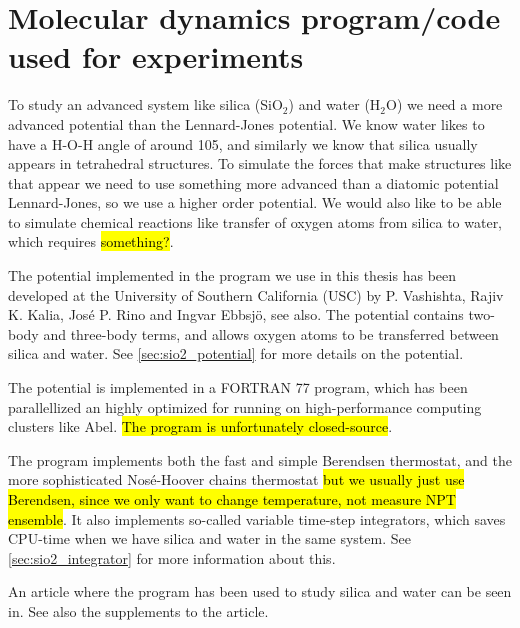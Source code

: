 \chapter{Molecular dynamics program/code used for experiments}
To study an advanced system like silica (SiO$_2$) and water (H$_2$O) we need a more advanced potential than the Lennard-Jones potential. We know water likes to have a H-O-H angle of around 105, and similarly we know that silica usually appears in tetrahedral structures. To simulate the forces that make structures like that appear we need to use something more advanced than a diatomic potential Lennard-Jones, so we use a higher order potential. We would also like to be able to simulate chemical reactions like transfer of oxygen atoms from silica to water, which requires \hl{something?}.

The potential implemented in the program we use in this thesis has been developed at the University of Southern California (USC) by P. Vashishta, Rajiv K. Kalia, José P. Rino and Ingvar Ebbsj\"o\cite{vashishta1990interaction}, see also\cite{shekhar2013nanobubble,shekhar2013nanobubble_supplements}. The potential contains two-body and three-body terms, and allows oxygen atoms to be transferred between silica and water. See \cref{sec:sio2_potential} for more details on the potential.

The potential is implemented in a FORTRAN 77 program, which has been parallellized an highly optimized for running on high-performance computing clusters like Abel. \hl{The program is unfortunately closed-source}.

The program implements both the fast and simple Berendsen thermostat, and the more sophisticated Nos\'e-Hoover chains thermostat \hl{but we usually just use Berendsen, since we only want to change temperature, not measure NPT ensemble}. It also implements so-called variable time-step integrators, which saves CPU-time when we have silica and water in the same system. See \cref{sec:sio2_integrator} for more information about this.

An article where the program has been used to study silica and water can be seen in\cite{shekhar2013nanobubble}. See also the supplements to the article\cite{shekhar2013nanobubble_supplements}.





